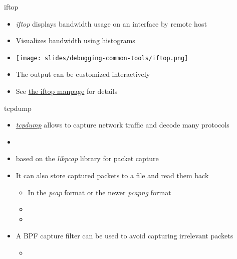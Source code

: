 \begin{frame}{iftop}
  \begin{itemize}
  \item {\em iftop} displays bandwidth usage on an interface by remote host
  \item Visualizes bandwidth using histograms
  \item {}
  \begin{center}
    \texttt{[image: slides/debugging-common-tools/iftop.png]}
  \end{center}
  \item The output can be customized interactively
    \item See \href{https://linux.die.net/man/8/iftop}{the iftop manpage}
      for details
  \end{itemize}
\end{frame}

\begin{frame}{tcpdump}
  \begin{itemize}
	  \item \href{https://www.tcpdump.org/}{\em tcpdump} allows to capture network traffic and decode many
    protocols
  \item {}
  \item based on the {\em libpcap} library for packet capture
  \item It can also store captured packets to a file and read them back
    \begin{itemize}
    \item In the {\em pcap} format or the newer {\em pcapng} format
    \item {}
    \item {}
    \end{itemize}
  \item A BPF capture filter can be used to avoid capturing irrelevant packets
    \begin{itemize}
    \item {}
    \end{itemize}
  \end{itemize}
\end{frame}

